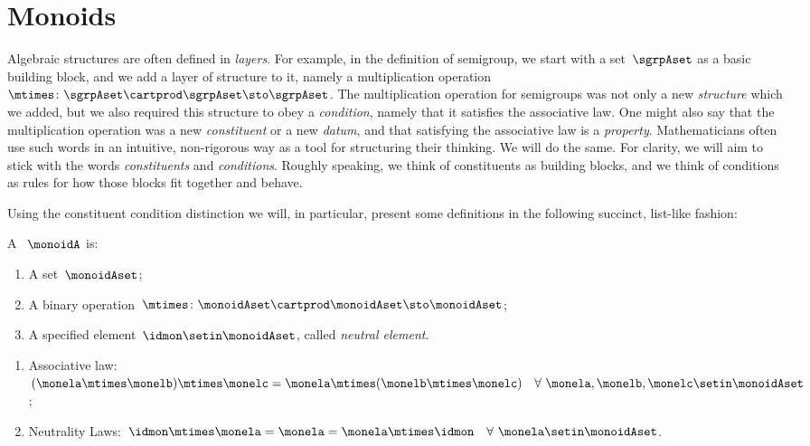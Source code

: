 
\section{Monoids}
\label{sec:parallelism-monoids}

Algebraic structures are often defined in \emph{layers}.
For example, in the definition of semigroup, we start with a set~$\sgrpAset$ as a basic building block, and we add a layer of structure to it, namely a multiplication operation~$\mtimes \colon \sgrpAset \cartprod \sgrpAset \sto \sgrpAset$.
The multiplication operation for semigroups was not only a new \emph{structure} which we added, but we also required this structure to obey a \emph{condition}, namely that it satisfies the associative law.
One might also say that the multiplication operation was a new \emph{constituent} or a new \emph{datum}, and that satisfying the associative law is a \emph{property}.
Mathematicians often use such words in an intuitive, non-rigorous way as a tool for structuring their thinking.
We will do the same.
For clarity, we will aim to stick with the words \emph{constituents} and \emph{conditions}.
Roughly speaking, we think of constituents as building blocks, and we think of conditions as rules for how those blocks fit together and behave.

Using the constituent \vs condition distinction we will, in particular, present some definitions in the following succinct, list-like fashion:

\begin{ctdefinition}[Monoid]
    \label{def:monoid}
    A \emph{}~$\monoidA$  is:
    \begin{body}
        \constit
        \begin{enumerate}
            \item A set~$\monoidAset$;
            \item A binary operation~$\mtimes  \colon \monoidAset \cartprod \monoidAset \sto \monoidAset$;
            \item A specified element~$\idmon \setin \monoidAset$, called \emph{neutral element}.
        \end{enumerate}
        \condit
        \begin{enumerate}
            \item Associative law:~$(\monela\mtimes  \monelb)\mtimes  \monelc=
                      \monela\mtimes  (\monelb\mtimes  \monelc) \quad  \forall \  \monela, \monelb, \monelc \setin \monoidAset$;
            \item Neutrality Laws:~$\idmon\mtimes \monela=\monela=\monela\mtimes  \idmon \quad  \forall \ \monela \setin \monoidAset $.
        \end{enumerate}
    \end{body}
\end{ctdefinition}

